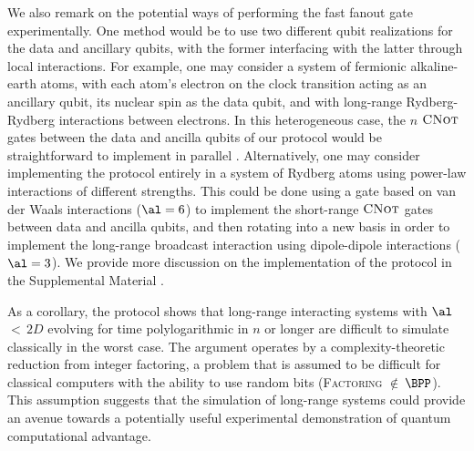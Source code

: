 We also remark on the potential ways of performing the fast fanout gate experimentally.
One method would be to use two different qubit realizations for the data and ancillary qubits,  with the former interfacing with the latter through local interactions.
For example, one may consider a system of fermionic alkaline-earth atoms, with each atom's electron on the clock transition acting as an ancillary qubit, its nuclear spin as the data qubit, and with long-range Rydberg-Rydberg interactions between electrons.
In this heterogeneous case, the $n$ $\textsc{CNot}$ gates between the data and ancilla qubits of our protocol would be straightforward to implement in parallel \cite{Gorshkov2009}.
Alternatively, one may consider implementing the protocol entirely in a system of Rydberg atoms using power-law interactions of different strengths.
This could be done using a gate based on %
van der Waals interactions ($\al = 6$) to implement the short-range $\textsc{CNot}$ gates between data and ancilla qubits, and then rotating into a new basis in order to implement the long-range broadcast interaction using dipole-dipole interactions ($\al = 3$).
We provide more discussion on the implementation of the protocol in the Supplemental Material \cite{SM}.

As
a corollary, the protocol shows that long-range interacting systems with $\al$\,$<$\,$2D$ evolving for time polylogarithmic in $n$ or longer are difficult to simulate classically in the worst case.
The argument operates by a complexity-theoretic reduction from integer factoring, a problem that is assumed to be difficult for classical computers with the ability to use random bits (\textsc{Factoring} $\notin$\,$\BPP$).
This assumption suggests that the simulation of long-range systems could provide an avenue towards a potentially useful experimental demonstration of quantum computational advantage.

